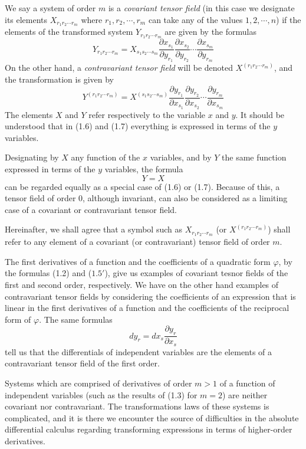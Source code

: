 \documentclass{book}
\begin{document}
We say a system of order $m$ is a \emph{covariant tensor field} (in this case we designate its elements $X_{r_1r_2\cdots r_m}$ where $r_1,r_2,\cdots,r_m$ can take any of the values $1,2,\cdots,n$) if the elements of the transformed system $Y_{r_1r_2\cdots r_m}$ are given by the formulas
\begin{equation}
Y_{r_1r_2\cdots r_m}=X_{s_1s_2\cdots s_m}\frac{\partial x_{s_1}}{\partial y_{r_1}}\frac{\partial x_{s_2}}{\partial y_{r_2}}\cdots\frac{\partial x_{s_m}}{\partial y_{r_m}}
\end{equation}
On the other hand, a \emph{contravariant tensor field} will be denoted $X^{(r_1r_2\cdots r_m)}$, and the transformation is given by
\begin{equation}
Y^{(r_1r_2\cdots r_m)}=X^{(s_1s_2\cdots s_m)}\frac{\partial y_{r_1}}{\partial x_{s_1}}\frac{\partial y_{r_2}}{\partial x_{s_2}}\cdots\frac{\partial y_{r_m}}{\partial x_{s_m}}
\end{equation}
The elements $X$ and $Y$ refer respectively to the variable $x$ and $y$. It should be understood that in (1.6) and (1.7) everything is expressed in terms of the $y$ variables.

Designating by $X$ any function of the $x$ variables, and by $Y$ the same function expressed in terms of the $y$ variables, the formula
$$Y=X$$
can be regarded equally as a special case of (1.6) or (1.7). Because of this, a tensor field of order 0, although invariant, can also be considered as a limiting case of a covariant or contravariant tensor field.

Hereinafter, we shall agree that a symbol such as $X_{r_1r_2\cdots r_m}$ (or $X^{(r_1r_2\cdots r_m)}$) shall refer to any element of a covariant (or contravariant) tensor field of order $m$.

The first derivatives of a function and the coefficients of a quadratic form $\varphi$, by the formulas (1.2) and ($1.5'$), give us examples of covariant tesnor fields of the first and second order, respectively. We have on the other hand examples of contravariant tensor fields by considering the coefficients of an expression that is linear in the first derivatives of a function and the coefficients of the reciprocal form of $\varphi$. The same formulas
$$dy_r=dx_s\frac{\partial y_r}{\partial x_s}$$
tell us that the differentials of independent variables are the elements of a contravariant tensor field of the first order.

Systems which are comprised of derivatives of order $m>1$ of a function of independent variables (such as the results of (1.3) for $m=2$) are neither covariant nor contravariant. The transformations laws of these systems is complicated, and it is there we encounter the source of difficulties in the absolute differential calculus regarding transforming expressions in terms of higher-order derivatives.
\end{document}
